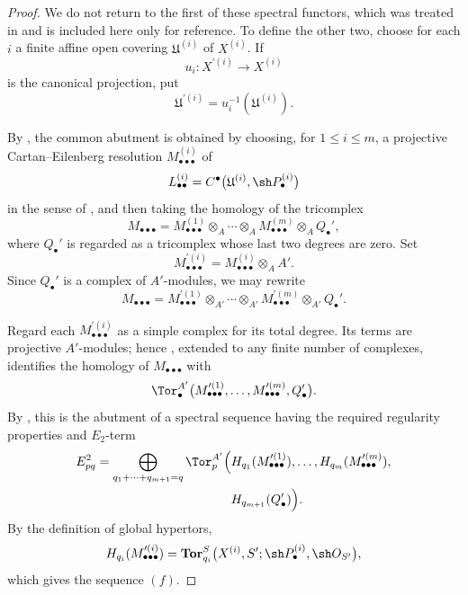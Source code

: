\begin{proof}
We do not return to the first of these spectral functors, which was
treated in  and is included here only for reference.
To define the other two, choose for each $i$ a finite affine open
covering $\mathfrak U^{(i)}$ of $X^{(i)}$.  If
\[
  u_i:X^{\prime(i)}\longrightarrow X^{(i)}
\]
is the canonical projection, put
\[
  \mathfrak U^{\prime(i)}
  =
  u_i^{-1}(\mathfrak U^{(i)}).
\]

By , the common abutment is obtained by choosing,
for $1\leq i\leq m$, a projective Cartan--Eilenberg resolution
$M_{\bullet\bullet\bullet}^{(i)}$ of
\[
  L_{\bullet\bullet}^{(i)}
  =
  C^\bullet
  \bigl(
    \mathfrak U^{(i)},\sh P_\bullet^{(i)}
  \bigr)
\]
in the sense of , and then taking the homology of
the tricomplex
\[
  M_{\bullet\bullet\bullet}
  =
  M_{\bullet\bullet\bullet}^{(1)}
  \otimes_A\cdots\otimes_A
  M_{\bullet\bullet\bullet}^{(m)}
  \otimes_A Q_\bullet',
\]
where $Q_\bullet'$ is regarded as a tricomplex whose last two
degrees are zero.  Set
\[
  M_{\bullet\bullet\bullet}^{\prime(i)}
  =
  M_{\bullet\bullet\bullet}^{(i)}\otimes_AA'.
\]
Since $Q_\bullet'$ is a complex of $A'$-modules, we may rewrite
\[
  M_{\bullet\bullet\bullet}
  =
  M_{\bullet\bullet\bullet}^{\prime(1)}
  \otimes_{A'}\cdots\otimes_{A'}
  M_{\bullet\bullet\bullet}^{\prime(m)}
  \otimes_{A'}Q_\bullet'.
\]

Regard each $M_{\bullet\bullet\bullet}^{\prime(i)}$ as a simple
complex for its total degree.  Its terms are projective
$A'$-modules; hence , extended to any finite number
of complexes, identifies the homology of
$M_{\bullet\bullet\bullet}$ with
\[
  \Tor_\bullet^{A'}
  \bigl(
    M_{\bullet\bullet\bullet}^{\prime(1)},\ldots,
    M_{\bullet\bullet\bullet}^{\prime(m)},Q_\bullet'
  \bigr).
\]
By , this is the abutment of a spectral sequence
having the required regularity properties and $E_2$-term
\[
\begin{split}
  E_{pq}^2
  =
  \bigoplus_{q_1+\cdots+q_{m+1}=q}
  \Tor_p^{A'}
  \Bigl(
    &
    H_{q_1}(M_{\bullet\bullet\bullet}^{\prime(1)}),\ldots,
    H_{q_m}(M_{\bullet\bullet\bullet}^{\prime(m)}),
    \\
    &
    H_{q_{m+1}}(Q_\bullet')
  \Bigr).
\end{split}
\]
By the definition of global hypertors,
\[
  H_{q_i}(M_{\bullet\bullet\bullet}^{\prime(i)})
  =
  \mathbf{Tor}_{q_i}^S
  \bigl(
    X^{(i)},S';
    \sh P_\bullet^{(i)},\sh O_{S'}
  \bigr),
\]
which gives the sequence $(f)$.


\end{proof}
